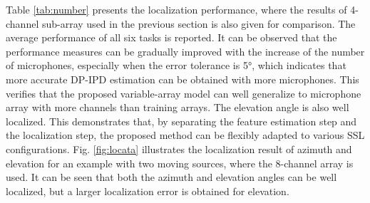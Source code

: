 \documentclass[lettersize,journal]{IEEEtran}
\begin{document}
Table \ref{tab:number} presents the localization performance, where the results of 4-channel sub-array used in the previous section is also given for comparison. The average performance of all six tasks is reported.  
It can be observed that the performance measures can be gradually improved with the increase of the number of microphones, especially when the error tolerance is 5°, which indicates that more accurate DP-IPD estimation can be obtained with more microphones. This verifies that the proposed variable-array model can well generalize to microphone array with more channels than training arrays. 
The elevation angle is also well localized. This demonstrates that, by separating the feature estimation step and the localization step, the proposed method can be flexibly adapted to various SSL configurations. 
Fig. \ref{fig:locata} illustrates the localization result of azimuth and elevation for an example with two moving sources, where the 8-channel array is used. It can be seen that both the azimuth and elevation angles can be well localized, but a larger localization error is obtained for elevation.
\end{document}
